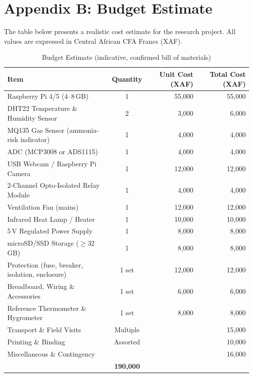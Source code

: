 \documentclass[12pt,a4paper]{report}
\begin{document}
\clearpage


\setcounter{table}{0}
\setcounter{figure}{0}
\renewcommand{\thetable}{B.\arabic{table}}
\renewcommand{\thefigure}{B.\arabic{figure}}
\chapter*{Appendix B: Budget Estimate}

The table below presents a realistic cost estimate for the research project. All values are expressed in Central African CFA Francs (XAF).

\begin{table}[H]
\caption{Budget Estimate (indicative, confirmed bill of materials)}
\label{tab:budget}
\centering
\small
\begin{tabularx}{\textwidth}{|X|c|r|r|}
\hline
\rowcolor{headerblue}
\textbf{Item} & \textbf{Quantity} & \textbf{Unit Cost (XAF)} & \textbf{Total Cost (XAF)} \\
\hline
Raspberry Pi 4/5 (4--8\,GB) & 1 & 55,000 & 55,000 \\
\hline
DHT22 Temperature \& Humidity Sensor & 2 & 3,000 & 6,000 \\
\hline
MQ135 Gas Sensor (ammonia-risk indicator) & 1 & 4,000 & 4,000 \\
\hline
ADC (MCP3008 or ADS1115) & 1 & 4,000 & 4,000 \\
\hline
USB Webcam / Raspberry Pi Camera & 1 & 12,000 & 12,000 \\
\hline
2-Channel Opto-Isolated Relay Module & 1 & 4,000 & 4,000 \\
\hline
Ventilation Fan (mains) & 1 & 12,000 & 12,000 \\
\hline
Infrared Heat Lamp / Heater & 1 & 10,000 & 10,000 \\
\hline
5\,V Regulated Power Supply & 1 & 8,000 & 8,000 \\
\hline
microSD/SSD Storage ($\geq$32\,GB) & 1 & 8,000 & 8,000 \\
\hline
Protection (fuse, breaker, isolation, enclosure) & 1 set & 12,000 & 12,000 \\
\hline
Breadboard, Wiring \& Accessories & 1 set & 6,000 & 6,000 \\
\hline
Reference Thermometer \& Hygrometer & 1 set & 8,000 & 8,000 \\
\hline
Transport \& Field Visits & Multiple & & 15,000 \\
\hline
Printing \& Binding & Assorted & & 10,000 \\
\hline
Miscellaneous \& Contingency & & & 16,000 \\
\hline
\rowcolor{headerblue}
\multicolumn{3}{|r|}{\textbf{Grand Total}} & \textbf{190,000} \\
\hline
\end{tabularx}
\end{table}
\end{document}
